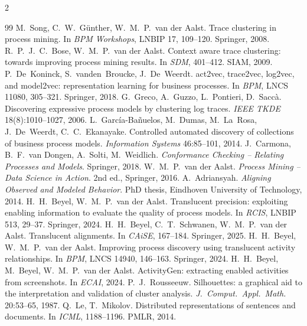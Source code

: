 \documentclass[10pt]{article}
\begin{document}
\clearpage
\footnotesize
\begin{multicols}{2}
\setlength{\itemsep}{1pt}
\begin{thebibliography}{99}
 M.\ Song, C.~W.\ G{\"u}nther, W.~M.~P.\ van der Aalst.
  Trace clustering in process mining. In \emph{BPM Workshops}, LNBIP 17,
  109--120. Springer, 2008.
 R.~P.~J.~C.\ Bose, W.~M.~P.\ van der Aalst. Context aware
  trace clustering: towards improving process mining results. In \emph{SDM},
  401--412. SIAM, 2009.
 P.\ De~Koninck, S.\ vanden~Broucke, J.\ De~Weerdt.
  act2vec, trace2vec, log2vec, and model2vec: representation learning for
  business processes. In \emph{BPM}, LNCS 11080, 305--321. Springer, 2018.
 G.\ Greco, A.\ Guzzo, L.\ Pontieri, D.\ Sacc{\`a}.
  Discovering expressive process models by clustering log traces.
  \emph{IEEE TKDE} 18(8):1010--1027, 2006.
 L.\ Garc{\'i}a-Ba{\~n}uelos, M.\ Dumas,
  M.\ La~Rosa, J.\ De~Weerdt, C.~C.\ Ekanayake. Controlled automated discovery
  of collections of business process models. \emph{Information Systems}
  46:85--101, 2014.
 J.\ Carmona, B.~F.\ van Dongen, A.\ Solti, M.\ Weidlich.
  \emph{Conformance Checking -- Relating Processes and Models}. Springer, 2018.
 W.~M.~P.\ van der Aalst. \emph{Process Mining -- Data
  Science in Action}. 2nd ed., Springer, 2016.
 A.\ Adriansyah. \emph{Aligning Observed and Modeled
  Behavior}. PhD thesis, Eindhoven University of Technology, 2014.
 H.~H.\ Beyel, W.~M.~P.\ van der Aalst. Translucent
  precision: exploiting enabling information to evaluate the quality of process
  models. In \emph{RCIS}, LNBIP 513, 29--37. Springer, 2024.
 H.~H.\ Beyel, C.~T.\ Schwanen, W.~M.~P.\ van der Aalst.
  Translucent alignments. In \emph{CAiSE}, 167--184. Springer, 2025.
 H.~H.\ Beyel, W.~M.~P.\ van der Aalst. Improving process
  discovery using translucent activity relationships. In \emph{BPM}, LNCS 14940,
  146--163. Springer, 2024.
 H.~H.\ Beyel, M.\ Beyel, W.~M.~P.\ van der Aalst.
  ActivityGen: extracting enabled activities from screenshots. In \emph{ECAI},
  2024.
 P.~J.\ Rousseeuw. Silhouettes: a graphical aid to the
  interpretation and validation of cluster analysis. \emph{J.\ Comput.\ Appl.\
  Math.} 20:53--65, 1987.
 Q.\ Le, T.\ Mikolov. Distributed representations of
  sentences and documents. In \emph{ICML}, 1188--1196. PMLR, 2014.
\end{thebibliography}
\end{multicols}
\end{document}
